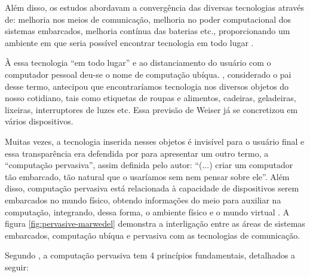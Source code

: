 Além disso, os estudos abordavam a convergência das diversas tecnologias 
através de: melhoria nos meios de comunicação, melhoria no poder computacional
dos sistemas embarcados, melhoria contínua das baterias etc., proporcionando
um ambiente em que seria possível encontrar tecnologia em todo lugar
\cite{lyytinen2002ubiquitous}.

À essa tecnologia ``em todo lugar'' e ao distanciamento do usuário com o
computador pessoal deu-se o nome de computação ubíqua.
, considerado o pai desse termo, antecipou que
encontraríamos tecnologia nos diversos objetos do nosso cotidiano, tais como
etiquetas de roupas e alimentos, cadeiras, geladeiras, lixeiras, interruptores
de luzes etc. Essa previsão de Weiser já se concretizou em vários dispositivos.


Muitas vezes, a tecnologia inserida nesses objetos é invisível para o usuário
final e essa transparência era defendida por  para
apresentar um outro termo, a ``computação pervasiva'', assim definida pelo
autor: ``(...) criar  um computador tão embarcado, tão natural que o usaríamos
sem nem pensar sobre ele''. Além disso, computação pervasiva está relacionada à
capacidade de dispositivos serem embarcados no mundo físico, obtendo
informações do meio para auxiliar na computação, integrando, dessa forma, o
ambiente físico e o mundo virtual \cite{bolsoni2009computaccao,
de2003computaccao}. A figura  \ref{fig:pervasive-marwedel} demonstra a
interligação entre as áreas de sistemas embarcados, computação ubíqua e
pervasiva com as tecnologias de comunicação.

Segundo , a computação pervasiva tem 4 princípios 
fundamentais, detalhados a seguir: 

